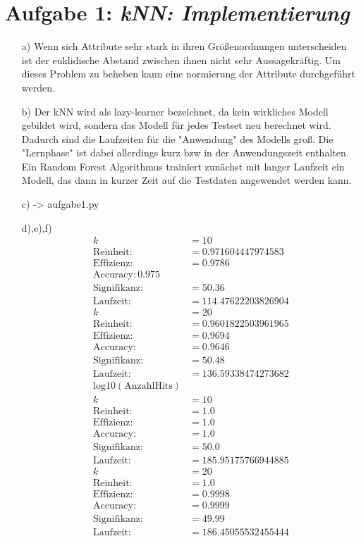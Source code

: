 \section*{Aufgabe 1: \emph{kNN: Implementierung}}
\begin{itemize}
\item[a)] Wenn sich Attribute sehr stark in ihren Größenordnungen unterscheiden ist der euklidische Abstand zwischen ihnen nicht sehr Aussagekräftig. Um dieses Problem zu beheben kann eine normierung der Attribute durchgeführt werden.

\item[b)] Der kNN wird als lazy-learner bezeichnet, da kein wirkliches Modell gebildet wird, sondern das Modell für jedes Testset neu berechnet wird. Dadurch sind die Laufzeiten für die "Anwendung" des Modells groß. Die "Lernphase" ist dabei allerdings kurz bzw in der Anwendungszeit enthalten. Ein Random Forest Algorithmus trainiert zunächst mit langer Laufzeit ein Modell, das dann in kurzer Zeit auf die Testdaten angewendet werden kann.

\item[c)] -> aufgabe1.py
\item[d),e),f)]
\begin{align*}
	k &=10 \\
	\mathrm{Reinheit: } &= 0.971604447974583 \\
	\mathrm{Effizienz: } &=0.9786 \\
	\mathrm{Accuracy : } 0.975 \\
	\mathrm{Signifikanz: } &= 50.36 \\
	\mathrm{Laufzeit : } &= 114.47622203826904 \\
	k &=20 \\
	\mathrm{Reinheit: } &=  0.9601822503961965 \\
	\mathrm{Effizienz: } &= 0.9694\\ 
	\mathrm{Accuracy: } &= 0.9646\\
	\mathrm{Signifikanz: } &=  50.48 \\
	\mathrm{Laufzeit: } &=136.59338474273682 \\
	\mathrm{log10(AnzahlHits)}&\\
	k &=10 \\
	\mathrm{Reinheit: } &=1.0\\
	\mathrm{Effizienz: } &=1.0\\
	\mathrm{Accuracy: } &=1.0\\
	\mathrm{Signifikanz: } &=50.0 \\
	\mathrm{Laufzeit :} &= 185.95175766944885 \\
	k &=20 \\
	\mathrm{Reinheit: }&= 1.0 \\
	\mathrm{Effizienz: }&= 0.9998 \\
	\mathrm{Accuracy: }&=  0.9999 \\
	\mathrm{Signifikanz: }&=  49.99 \\
	\mathrm{Laufzeit: }&= 186.45055532455444 \\
\end{align*}


\end{itemize}
